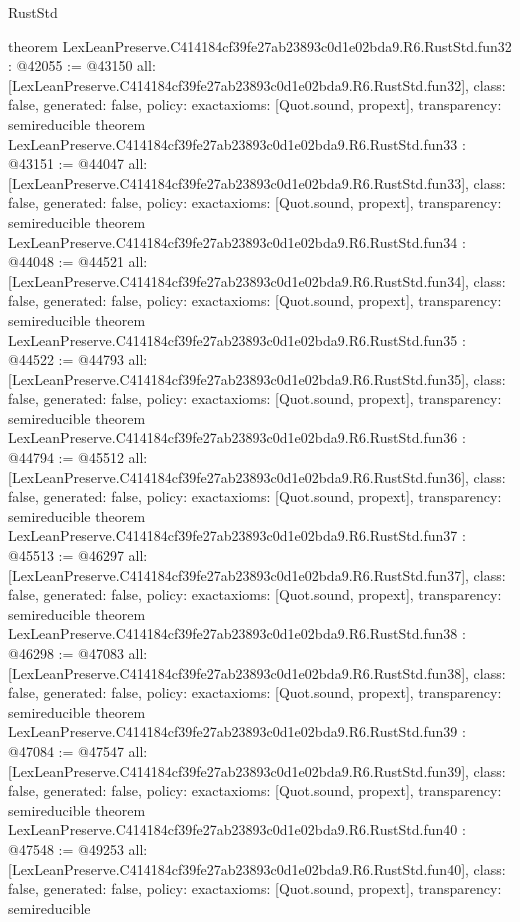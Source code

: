 \begin{lexlean}{RustStd}
\begin{coremodule}
{}
theorem LexLeanPreserve.C414184cf39fe27ab23893c0d1e02bda9.R6.RustStd.fun32 : @42055 := @43150 {
  all: [LexLeanPreserve.C414184cf39fe27ab23893c0d1e02bda9.R6.RustStd.fun32],
  class: false,
  generated: false,
  policy: exact{axioms: [Quot.sound, propext]},
  transparency: semireducible
}
theorem LexLeanPreserve.C414184cf39fe27ab23893c0d1e02bda9.R6.RustStd.fun33 : @43151 := @44047 {
  all: [LexLeanPreserve.C414184cf39fe27ab23893c0d1e02bda9.R6.RustStd.fun33],
  class: false,
  generated: false,
  policy: exact{axioms: [Quot.sound, propext]},
  transparency: semireducible
}
theorem LexLeanPreserve.C414184cf39fe27ab23893c0d1e02bda9.R6.RustStd.fun34 : @44048 := @44521 {
  all: [LexLeanPreserve.C414184cf39fe27ab23893c0d1e02bda9.R6.RustStd.fun34],
  class: false,
  generated: false,
  policy: exact{axioms: [Quot.sound, propext]},
  transparency: semireducible
}
theorem LexLeanPreserve.C414184cf39fe27ab23893c0d1e02bda9.R6.RustStd.fun35 : @44522 := @44793 {
  all: [LexLeanPreserve.C414184cf39fe27ab23893c0d1e02bda9.R6.RustStd.fun35],
  class: false,
  generated: false,
  policy: exact{axioms: [Quot.sound, propext]},
  transparency: semireducible
}
theorem LexLeanPreserve.C414184cf39fe27ab23893c0d1e02bda9.R6.RustStd.fun36 : @44794 := @45512 {
  all: [LexLeanPreserve.C414184cf39fe27ab23893c0d1e02bda9.R6.RustStd.fun36],
  class: false,
  generated: false,
  policy: exact{axioms: [Quot.sound, propext]},
  transparency: semireducible
}
theorem LexLeanPreserve.C414184cf39fe27ab23893c0d1e02bda9.R6.RustStd.fun37 : @45513 := @46297 {
  all: [LexLeanPreserve.C414184cf39fe27ab23893c0d1e02bda9.R6.RustStd.fun37],
  class: false,
  generated: false,
  policy: exact{axioms: [Quot.sound, propext]},
  transparency: semireducible
}
theorem LexLeanPreserve.C414184cf39fe27ab23893c0d1e02bda9.R6.RustStd.fun38 : @46298 := @47083 {
  all: [LexLeanPreserve.C414184cf39fe27ab23893c0d1e02bda9.R6.RustStd.fun38],
  class: false,
  generated: false,
  policy: exact{axioms: [Quot.sound, propext]},
  transparency: semireducible
}
theorem LexLeanPreserve.C414184cf39fe27ab23893c0d1e02bda9.R6.RustStd.fun39 : @47084 := @47547 {
  all: [LexLeanPreserve.C414184cf39fe27ab23893c0d1e02bda9.R6.RustStd.fun39],
  class: false,
  generated: false,
  policy: exact{axioms: [Quot.sound, propext]},
  transparency: semireducible
}
theorem LexLeanPreserve.C414184cf39fe27ab23893c0d1e02bda9.R6.RustStd.fun40 : @47548 := @49253 {
  all: [LexLeanPreserve.C414184cf39fe27ab23893c0d1e02bda9.R6.RustStd.fun40],
  class: false,
  generated: false,
  policy: exact{axioms: [Quot.sound, propext]},
  transparency: semireducible
}
\end{coremodule}
\end{lexlean}
